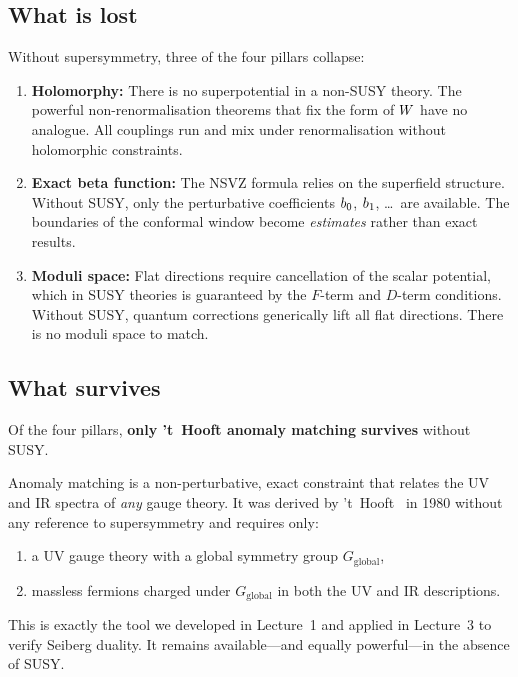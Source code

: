 \documentclass[11pt,a4paper]{article}
\begin{document}
\subsection{What is lost}

Without supersymmetry, three of the four pillars collapse:

\begin{enumerate}[label=(\alph*)]
  \item \textbf{Holomorphy:} There is no superpotential in a non-SUSY
    theory.  The powerful non-renormalisation theorems that fix the
    form of $W$ have no analogue.  All couplings run and mix
    under renormalisation without holomorphic constraints.

  \item \textbf{Exact beta function:} The NSVZ formula relies on the
    superfield structure.  Without SUSY, only the perturbative
    coefficients $b_0$, $b_1$, \ldots\ are available.  The
    boundaries of the conformal window become \emph{estimates} rather
    than exact results.

  \item \textbf{Moduli space:} Flat directions require cancellation of
    the scalar potential, which in SUSY theories is guaranteed by the
    $F$-term and $D$-term conditions.  Without SUSY, quantum
    corrections generically lift all flat directions.  There is no
    moduli space to match.
\end{enumerate}

\subsection{What survives}

\begin{warningbox}[title={The sole surviving tool}]
  Of the four pillars, \textbf{only 't~Hooft anomaly matching
  survives} without SUSY.

  Anomaly matching is a non-perturbative, exact constraint that
  relates the UV and IR spectra of \emph{any} gauge theory.  It was
  derived by 't~Hooft~\cite{tHooft1980} in 1980 without any
  reference to supersymmetry and requires only:
  \begin{enumerate}[label=(\roman*)]
    \item a UV gauge theory with a global symmetry group $G_{\mathrm{global}}$,
    \item massless fermions charged under $G_{\mathrm{global}}$
      in both the UV and IR descriptions.
  \end{enumerate}
  This is exactly the tool we developed in Lecture~1 and applied in
  Lecture~3 to verify Seiberg duality.  It remains available---and
  equally powerful---in the absence of SUSY.
\end{warningbox}
\end{document}
